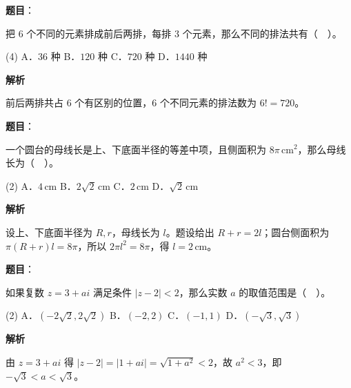 \begin{answer}

\textbf{题目}：

把 $6$ 个不同的元素排成前后两排，每排 $3$ 个元素，那么不同的排法共有（　）。

\begin{gkopts}(4)
\task A．$36$ 种
\task B．$120$ 种
\task C．$720$ 种
\task D．$1440$ 种
\end{gkopts}

\textbf{解析}

前后两排共占 $6$ 个有区别的位置，$6$ 个不同元素的排法数为 $6!=720$。


\end{answer}
\begin{answer}

\textbf{题目}：

一个圆台的母线长是上、下底面半径的等差中项，且侧面积为 $8\pi\,\mathrm{cm}^2$，那么母线长为（　）。

\begin{gkopts}(2)
\task A．$4\,\mathrm{cm}$
\task B．$2\sqrt2\,\mathrm{cm}$
\task C．$2\,\mathrm{cm}$
\task D．$\sqrt2\,\mathrm{cm}$
\end{gkopts}

\textbf{解析}

设上、下底面半径为 $R,r$，母线长为 $l$。题设给出 $R+r=2l$；圆台侧面积为 $\pi(R+r)l=8\pi$，所以 $2\pi l^2=8\pi$，得 $l=2\,\mathrm{cm}$。


\end{answer}
\begin{answer}

\textbf{题目}：

如果复数 $z=3+ai$ 满足条件 $|z-2|<2$，那么实数 $a$ 的取值范围是（　）。

\begin{gkopts}(2)
\task A．$(-2\sqrt2,2\sqrt2)$
\task B．$(-2,2)$
\task C．$(-1,1)$
\task D．$(-\sqrt3,\sqrt3)$
\end{gkopts}

\textbf{解析}

由 $z=3+ai$ 得 $|z-2|=|1+ai|=\sqrt{1+a^2}<2$，故 $a^2<3$，即 $-\sqrt3<a<\sqrt3$。


\end{answer}

